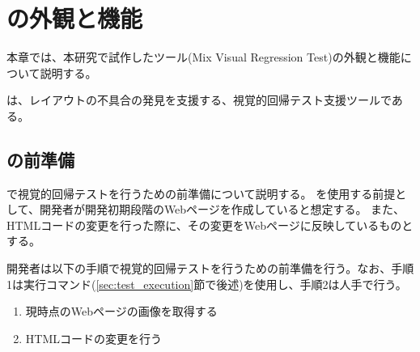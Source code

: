 \chapter{ \toolName の外観と機能}\label{cha:Function}
本章では、本研究で試作したツール\toolName (Mix Visual Regression Test)の外観と機能について説明する。
\par
\toolName は、レイアウトの不具合の発見を支援する、視覚的回帰テスト支援ツールである。

\section{\toolName の前準備}\label{sec:preparation}
\toolName で視覚的回帰テストを行うための前準備について説明する。
\toolName を使用する前提として、開発者が開発初期段階のWebページを作成していると想定する。
また、HTMLコードの変更を行った際に、その変更をWebページに反映しているものとする。
\par
開発者は以下の手順で視覚的回帰テストを行うための前準備を行う。なお、手順1は\toolName 実行コマンド(\ref{sec:test_execution}節で後述)を使用し、手順2は人手で行う。
\begin{enumerate}
    \item 現時点のWebページの画像を取得する
    \item HTMLコードの変更を行う
\end{enumerate}

